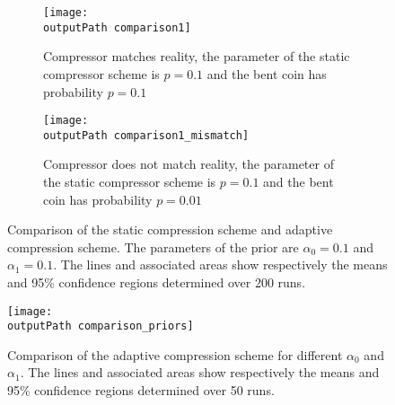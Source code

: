 \documentclass[letterpaper,11pt]{extarticle}
\newcommand{\outputPath}{output/}
\begin{document}
\begin{figure}[ht]
    \centering
    \begin{subfigure}{.49\linewidth}
        \texttt{[image: \\outputPath comparison1]}
        \caption{Compressor matches reality, the parameter of the static compressor scheme is $p=0.1$ and the bent coin has probability $p=0.1$}
    \end{subfigure}
    \begin{subfigure}{.49\linewidth}
        \texttt{[image: \\outputPath comparison1\_mismatch]}
        \caption{Compressor does not match reality, the parameter of the static compressor scheme is $p=0.1$ and the bent coin has probability $p=0.01$}
    \end{subfigure}
    \caption{Comparison of the static compression scheme and adaptive compression scheme. The parameters of the prior are $\alpha_0=0.1$ and $\alpha_1=0.1$. The lines and associated areas show respectively the means and 95\% confidence regions determined over 200 runs.}
    \label{fig:comparison_mismatch}
\end{figure}


\begin{figure}[ht]
    \centering
    \texttt{[image: \\outputPath comparison\_priors]}
    \caption{Comparison of the adaptive compression scheme for different $\alpha_0$ and $\alpha_1$. The lines and associated areas show respectively the means and 95\% confidence regions determined over 50 runs.}
    \label{fig:comparison_priors}
\end{figure}

\endgroup
\printbibliography
\end{document}
